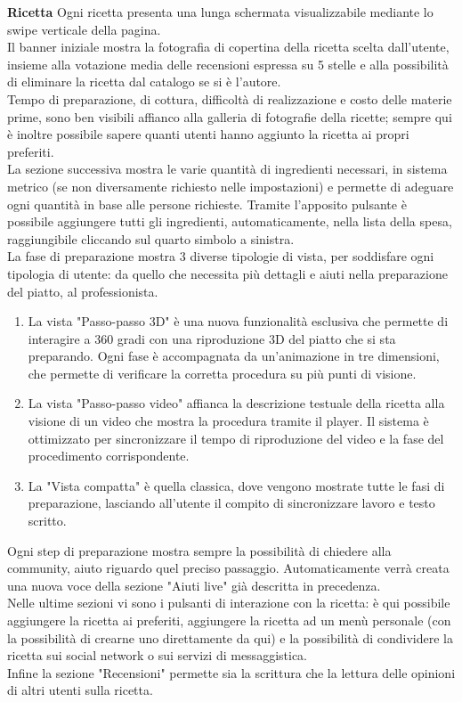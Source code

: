 \textbf{Ricetta}
Ogni ricetta presenta una lunga schermata visualizzabile mediante lo swipe verticale della pagina.\\
Il banner iniziale mostra la fotografia di copertina della ricetta scelta dall'utente, insieme alla votazione media delle recensioni espressa su 5 stelle e alla possibilità di eliminare la ricetta dal catalogo se si è l'autore.\\
Tempo di preparazione, di cottura, difficoltà di realizzazione e costo delle materie prime, sono ben visibili affianco alla galleria di fotografie della ricette; sempre qui è inoltre possibile sapere quanti utenti hanno aggiunto la ricetta ai propri preferiti.\\
La sezione successiva mostra le varie quantità di ingredienti necessari, in sistema metrico (se non diversamente richiesto nelle impostazioni) e permette di adeguare ogni quantità in base alle persone richieste. Tramite l'apposito pulsante è possibile aggiungere tutti gli ingredienti, automaticamente, nella lista della spesa, raggiungibile cliccando sul quarto simbolo a sinistra.\\
La fase di preparazione mostra 3 diverse tipologie di vista, per soddisfare ogni tipologia di utente: da quello che necessita più dettagli e aiuti nella preparazione del piatto, al professionista.\\
\begin{enumerate}
\item La vista "Passo-passo 3D" è una nuova funzionalità esclusiva che permette di interagire a 360 gradi con una riproduzione 3D del piatto che si sta preparando. Ogni fase è accompagnata da un'animazione in tre dimensioni, che permette di verificare la corretta procedura su più punti di visione.
\item La vista "Passo-passo video" affianca la descrizione testuale della ricetta alla visione di un video che mostra la procedura tramite il player. Il sistema è ottimizzato per sincronizzare il tempo di riproduzione del video e la fase del procedimento corrispondente.
\item La "Vista compatta" è quella classica, dove vengono mostrate tutte le fasi di preparazione, lasciando all'utente il compito di sincronizzare lavoro e testo scritto.
\end{enumerate}
Ogni step di preparazione mostra sempre la possibilità di chiedere alla community, aiuto riguardo quel preciso passaggio. Automaticamente verrà creata una nuova voce della sezione "Aiuti live" già descritta in precedenza.\\
Nelle ultime sezioni vi sono i pulsanti di interazione con la ricetta: è qui possibile aggiungere la ricetta ai preferiti, aggiungere la ricetta ad un menù personale (con la possibilità di crearne uno direttamente da qui) e la possibilità di condividere la ricetta sui social network o sui servizi di messaggistica.\\
Infine la sezione "Recensioni" permette sia la scrittura che la lettura delle opinioni di altri utenti sulla ricetta.\\

